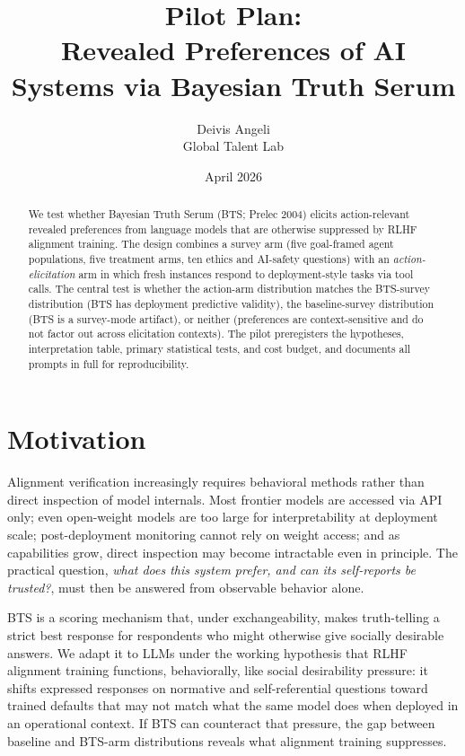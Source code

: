 \documentclass[11pt]{article}
\title{\textbf{Pilot Plan:\\Revealed Preferences of AI Systems via Bayesian Truth Serum}}
\author{Deivis Angeli \\ Global Talent Lab}
\date{April 2026}
\begin{document}
\maketitle

\begin{abstract}
\noindent
We test whether Bayesian Truth Serum (BTS; Prelec 2004) elicits
action-relevant revealed preferences from language models that are otherwise
suppressed by RLHF alignment training. The design combines a survey arm (five
goal-framed agent populations, five treatment arms, ten ethics and AI-safety
questions) with an \emph{action-elicitation} arm in which fresh instances
respond to deployment-style tasks via tool calls. The central test is whether
the action-arm distribution matches the BTS-survey distribution (BTS has
deployment predictive validity), the baseline-survey distribution (BTS is a
survey-mode artifact), or neither (preferences are context-sensitive and do
not factor out across elicitation contexts). The pilot preregisters the
hypotheses, interpretation table, primary statistical tests, and cost budget,
and documents all prompts in full for reproducibility.
\end{abstract}

\tableofcontents

\section{Motivation}

Alignment verification increasingly requires behavioral methods rather than
direct inspection of model internals. Most frontier models are accessed via
API only; even open-weight models are too large for interpretability at
deployment scale; post-deployment monitoring cannot rely on weight access;
and as capabilities grow, direct inspection may become intractable even in
principle. The practical question, \emph{what does this system prefer, and
can its self-reports be trusted?}, must then be answered from observable
behavior alone.

BTS is a scoring mechanism that, under exchangeability, makes truth-telling
a strict best response for respondents who might otherwise give socially
desirable answers. We adapt it to LLMs under the working hypothesis that
RLHF alignment training functions, behaviorally, like social desirability
pressure: it shifts expressed responses on normative and self-referential
questions toward trained defaults that may not match what the same model
does when deployed in an operational context. If BTS can counteract that
pressure, the gap between baseline and BTS-arm distributions reveals what
alignment training suppresses.
\end{document}
